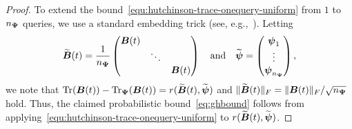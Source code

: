 \begin{proof}
    To extend the bound~\eqref{equ:hutchinson-trace-onequery-uniform} from $1$ to $n_{\boldsymbol{\Psi}}$ queries, we use a standard embedding trick (see, e.g.,~\cite[Theorem 1]{cortinovis-2022-randomized-trace}). Letting
    \begin{equation}
        \widetilde{\boldsymbol{B}}(t)
        = \frac{1}{n_{\boldsymbol{\Psi}}} \begin{pmatrix}
            \boldsymbol{B}(t) & & \\
            & \ddots & \\
            & & \boldsymbol{B}(t)
        \end{pmatrix}
        \quad \text{and} \quad
        \widetilde{\boldsymbol{\psi}} = \begin{pmatrix}
            \boldsymbol{\psi}_1 \\
            \vdots \\
            \boldsymbol{\psi}_{n_{\boldsymbol{\Psi}}}
        \end{pmatrix},
    \end{equation}
    we note that $\operatorname{Tr}(\boldsymbol{B}(t)) - \operatorname{Tr}_{\boldsymbol{\Psi}}(\boldsymbol{B}(t)) = r(\widetilde{\boldsymbol{B}}(t), \widetilde{\boldsymbol{\psi}})$ and $\lVert \widetilde{\boldsymbol{B}}(t) \rVert _F = \lVert \boldsymbol{B}(t) \rVert _F / \sqrt{n_{\boldsymbol{\Psi}}}$ hold. Thus, the claimed probabilistic bound~\eqref{eq:ghbound} follows from applying~\eqref{equ:hutchinson-trace-onequery-uniform} to $r(\widetilde{\boldsymbol{B}}(t), \widetilde{\boldsymbol{\psi}})$.


\end{proof}
